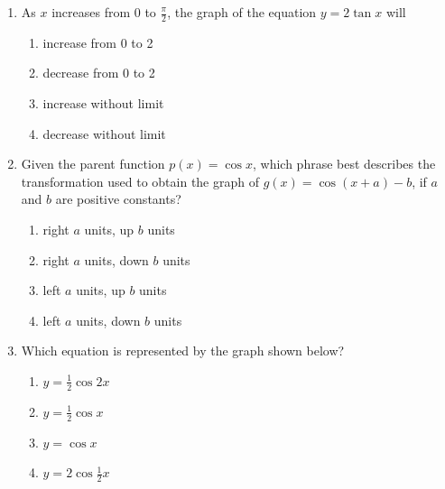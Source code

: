 \documentclass[12pt, oneside]{article}
\begin{document}
\begin{enumerate}
\item As $x$ increases from 0 to $\frac{\pi}{2}$, the graph of the equation $y=2 \tan x$ will
\begin{enumerate}
    \item increase from 0 to 2
    \item decrease from 0 to 2
    \item increase without limit
    \item decrease without limit
\end{enumerate} %

\item Given the parent function $p(x)=\cos x$, which phrase best describes the transformation used to obtain the graph of $g(x)=  \cos (x+a) - b$, if $a$ and $b$ are positive constants?
\begin{enumerate}
    \item right $a$ units, up $b$ units
    \item right $a$ units, down $b$ units
    \item left $a$ units, up $b$ units
    \item left $a$ units, down $b$ units
\end{enumerate}%

\item Which equation is represented by the graph shown below?
\begin{center}
\end{center}
\begin{enumerate}
    \item $y=\frac{1}{2} \cos 2x$
    \item $y=\frac{1}{2} \cos x$
    \item $y= \cos x$
    \item $y=2 \cos \frac{1}{2}x$
\end{enumerate} %


\end{enumerate}
\end{document}
